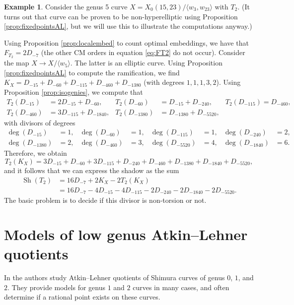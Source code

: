 \documentclass[12pt]{amsart}
\DeclareMathOperator{\Sh}{Sh}
\numberwithin{equation}{subsection}
\theoremstyle{plain}\newtheorem{ithm}{Theorem}
\theoremstyle{plain}\newtheorem{iprop}[ithm]{Proposition}
\theoremstyle{definition}
\newtheorem{example}[equation]{Example}
\theoremstyle{remark}
\newcommand{\Curve}[2]{X_0({#1},{#2})} %
\begin{document}
\begin{example}
Consider the genus 5 curve $X = \Curve{15}{ 23}/\langle w_3, w_{23}\rangle$ with $T_2$. (It turns out that curve can be proven to be non-hyperelliptic using Proposition \ref{prop:fixedpointsAL}, but we will use this to illustrate the computations anyway.)

Using Proposition \ref{prop:localembed} to count optimal embeddings, we have that  $F_{T_2} = 2D_{-7}$ (the other CM orders in equation \eqref{eq:FT2} do not occur).
Consider the map  
$X \to X / \langle w_5 \rangle$. The latter is an elliptic curve. Using Proposition \ref{prop:fixedpointsAL} to compute the ramification, we find 
$K_X = D_{-15} + D_{-60} + D_{-115} + D_{-460} + D_{-1380}$ (with degrees $1, 1, 1, 3, 2$).
Using Proposition \ref{prop:isogenies}, we compute that
\begin{align*}
T_2(D_{-15}) &= 2D_{-15} + D_{-60}, &
T_2(D_{-60}) &= D_{-15} + D_{-240}, &
T_2(D_{-115}) = D_{-460},\\
T_2(D_{-460}) &= 3D_{-115} + D_{-1840}, &
T_2(D_{-1380}) &= D_{-1380} + D_{-5520}, &
\end{align*}
with divisors of degrees
\begin{align*}
\deg(D_{-15}) &= 1, & \deg(D_{-60}) &= 1, & \deg(D_{-115}) &= 1, &
\deg(D_{-240}) &= 2, \\
\deg(D_{-1380}) &= 2, &
\deg(D_{-460}) &= 3, & \deg(D_{-5520}) &= 4,  & \deg(D_{-1840}) &= 6.
\end{align*}
Therefore, we obtain
$$
T_2(K_X) = 3D_{-15} + D_{-60} + 3D_{-115} + D_{-240} + D_{-460} + D_{-1380} + D_{-1840} + D_{-5520},
$$
and it follows that we can express the shadow as the sum
\begin{align*}
\Sh(T_2) &= 16D_{-7} + 2K_X - 2T_2(K_X) \\
&= 16D_{-7} - 4D_{-15} -4D_{-115} - 2D_{-240} -2D_{-1840} - 2D_{-5520}.
\end{align*}
The basic problem is to decide if this divisor is non-torsion or not. 
\end{example}


\section{Models of low genus Atkin--Lehner quotients}
\label{sec:models}

In \cite{OanaFreddy} the authors study Atkin--Lehner quotients of Shimura curves of genus $0$, $1$, and $2$. 
They provide models for genus $1$ and $2$ curves in many cases, and often  determine if a rational point exists on these curves. 
\end{document}
